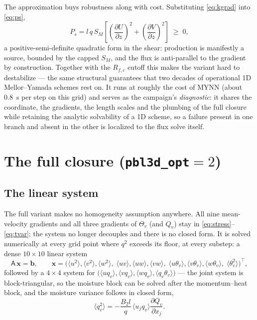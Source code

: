 \documentclass[10pt,a4paper]{article}
\newcommand{\avg}[1]{\langle #1 \rangle}
\newcommand{\pd}[2]{\frac{\partial #1}{\partial #2}}
\begin{document}
The approximation buys robustness along with cost. Substituting \eqref{eq:kgrad} into \eqref{eq:ps},
\begin{equation}
P_s = l\,q\,S_M \left[ \left(\pd{U}{z}\right)^{\!2} + \left(\pd{V}{z}\right)^{\!2} \right] \;\ge\; 0,
\label{eq:psapprox}
\end{equation}
a positive-semi-definite quadratic form in the shear: production is manifestly a source, bounded by the capped $S_M$, and the flux is anti-parallel to the gradient by construction. Together with the $R_{f,c}$ cutoff this makes the variant hard to destabilize — the same structural guarantees that two decades of operational 1D Mellor--Yamada schemes rest on. It runs at roughly the cost of MYNN (about 0.8~s per step on this grid) and serves as the campaign's \emph{diagnostic}: it shares the coordinate, the gradients, the length scales and the plumbing of the full closure while retaining the analytic solvability of a 1D scheme, so a failure present in one branch and absent in the other is localized to the flux solve itself.

\section{The full closure (\texttt{pbl3d\_opt}$=2$)}
\label{sec:full}

\subsection{The linear system}

The full variant makes no homogeneity assumption anywhere. All nine mean-velocity gradients and all three gradients of $\Theta_v$ (and $Q_v$) stay in \eqref{eq:stress}--\eqref{eq:tvar}; the system no longer decouples and there is no closed form. It is solved numerically at every grid point where $q^2$ exceeds its floor, at every substep: a dense $10\times10$ linear system
\begin{equation}
\mathsf{A}\,\mathbf{x} = \mathbf{b},
\qquad
\mathbf{x} = \big( \avg{u^2}, \avg{v^2}, \avg{w^2},\; \avg{uv}, \avg{uw}, \avg{vw},\;
\avg{u\theta_v}, \avg{v\theta_v}, \avg{w\theta_v},\; \avg{\theta_v^2} \big)^{\!\top},
\end{equation}
followed by a $4\times4$ system for $\big(\avg{u q_v}, \avg{v q_v}, \avg{w q_v}, \avg{q_v\theta_v}\big)$ — the joint system is block-triangular, so the moisture block can be solved after the momentum--heat block, and the moisture variance follows in closed form,
\begin{equation}
\avg{q_v^2} = -\frac{B_2 l}{q}\, \avg{u_j q_v} \pd{Q_v}{x_j}.
\end{equation}
\end{document}
